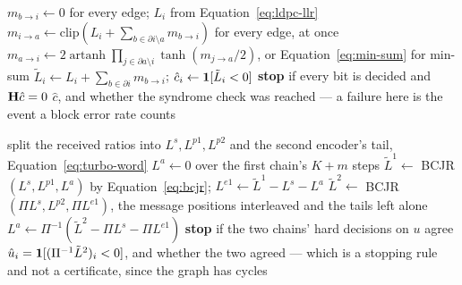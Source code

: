 \documentclass[11pt,a4paper]{article}
\begin{document}
\begin{algorithm}[htbp]
\caption{Sum-product decoding in the log domain,
Equation~\ref{eq:tanh-rule}}
\label{alg:sum-product-decode}
\begin{algorithmic}[1]
\State $m_{b \to i} \gets 0$ for every edge; $L_i$ from
       Equation~\ref{eq:ldpc-llr}
  \State $m_{i \to a} \gets \mathrm{clip}(L_i + \sum_{b \in \partial i
         \setminus a} m_{b \to i})$ for every edge, at once
  \State $m_{a \to i} \gets 2 \operatorname{artanh} \prod_{j \in \partial a
         \setminus i} \tanh (m_{j \to a}/2)$, or
         Equation~\ref{eq:min-sum} for min-sum
  \State $\tilde L_i \gets L_i + \sum_{b \in \partial i} m_{b \to i}$;
         $\hat c_i \gets \mathbf{1}[\tilde L_i < 0]$
  \State \textbf{stop} if every bit is decided and $\mathbf{H} \hat c = 0$
\EndFor
\State \Return $\hat c$, and whether the syndrome check was reached --- a
       failure here is the event a block error rate counts
\end{algorithmic}
\end{algorithm}

\begin{algorithm}[htbp]
\caption{Turbo decoding: the serial extrinsic exchange,
Equation~\ref{eq:extrinsic}}
\label{alg:turbo-decode}
\begin{algorithmic}[1]
\State split the received ratios into $L^{s}, L^{p1}, L^{p2}$ and the second
       encoder's tail, Equation~\ref{eq:turbo-word}
\State $L^{a} \gets 0$ over the first chain's $K + m$ steps
  \State $\tilde L^{1} \gets$ BCJR$(L^{s}, L^{p1}, L^{a})$ by
         Equation~\ref{eq:bcjr}; $L^{e1} \gets \tilde L^{1} - L^{s} - L^{a}$
  \State $\tilde L^{2} \gets$ BCJR$(\Pi L^{s}, L^{p2}, \Pi L^{e1})$, the
         message positions interleaved and the tails left alone
  \State $L^{a} \gets \Pi^{-1}(\tilde L^{2} - \Pi L^{s} - \Pi L^{e1})$
  \State \textbf{stop} if the two chains' hard decisions on $u$ agree
\EndFor
\State \Return $\hat u_i = \mathbf{1}[(\Pi^{-1}\tilde L^{2})_i < 0]$, and
       whether the two agreed --- which is a stopping rule and not a
       certificate, since the graph has cycles
\end{algorithmic}
\end{algorithm}
\end{document}
